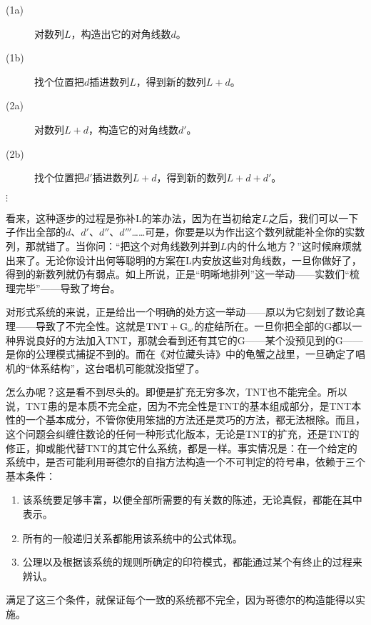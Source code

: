 \begin{description}
\item[(1a)]对数列$L$，构造出它的对角线数$d$。
\item[(1b)]找个位置把$d$插进数列$L$，得到新的数列$L+d$。
\item[(2a)]对数列$L+d$，构造它的对角线数$d'$。
\item[(2b)]找个位置把$d'$插进数列$L+d$，得到新的数列$L+d+d'$。
\item[\quad$\vdots$]
\end{description}
看来，这种逐步的过程是弥补L的笨办法，因为在当初给定$L$之后，我们可以一下子作出全部的$d$、$d'$、$d''$、$d'''$……可是，你要是以为作出这个数列就能补全你的实数列，那就错了。当你问：“把这个对角线数列并到$L$内的什么地方？”这时候麻烦就出来了。无论你设计出何等聪明的方案在L内安放这些对角线数，一旦你做好了，得到的新数列就仍有弱点。如上所说，正是“明晰地排列”这一举动——实数们“梳理完毕”——导致了垮台。

对形式系统的来说，正是给出一个明确的处方这一举动——原以为它刻划了数论真理——导致了不完全性。这就是$\mathrm { TNT }+\mathrm { G }_\omega$的症结所在。一旦你把全部的G都以一种界说良好的方法加入TNT，那就会看到还有其它的G——某个没预见到的G——是你的公理模式捕捉不到的。而在《对位藏头诗》中的龟蟹之战里，一旦确定了唱机的“体系结构”，这台唱机可能就没指望了。

怎么办呢？这是看不到尽头的。即便是扩充无穷多次，TNT也不能完全。所以说，TNT患的是本质不完全症，因为不完全性是TNT的基本组成部分，是TNT本性的一个基本成分，不管你使用笨拙的方法还是灵巧的方法，都无法根除。而且，这个问题会纠缠住数论的任何一种形式化版本，无论是TNT的扩充，还是TNT的修正，抑或能代替TNT的其它什么系统，都是一样。事实情况是：在一个给定的系统中，是否可能利用哥德尔的自指方法构造一个不可判定的符号串，依赖于三个基本条件：
\begin{enumerate}
\item 该系统要足够丰富，以便全部所需要的有关数的陈述，无论真假，都能在其中表示。
\item 所有的一般递归关系都能用该系统中的公式体现。
\item 公理以及根据该系统的规则所确定的印符模式，都能通过某个有终止的过程来辨认。
\end{enumerate}
满足了这三个条件，就保证每个一致的系统都不完全，因为哥德尔的构造能得以实施。

